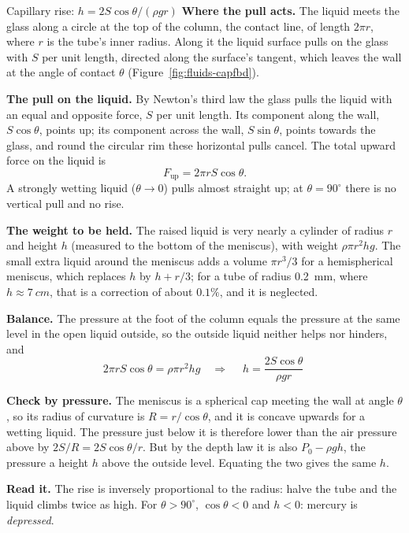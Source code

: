 \begin{figure}[htbp]
\centering
{}
\end{figure}

\begin{derivbox}{Capillary rise: $h=2S\cos\theta/(\rho gr)$}
 \textbf{Where the pull acts.} The liquid meets the glass along a circle at the top of the column, the
contact line, of length $2\pi r$, where $r$ is the tube's inner radius. Along it the liquid surface pulls on
the glass with $S$ per unit length, directed along the surface's tangent, which leaves the wall at the
angle of contact $\theta$ (Figure~\ref{fig:fluids-capfbd}).

 \textbf{The pull on the liquid.} By Newton's third law the glass pulls the liquid with an equal and
opposite force, $S$ per unit length. Its component along the wall, $S\cos\theta$, points up; its component
across the wall, $S\sin\theta$, points towards the glass, and round the circular rim these horizontal pulls
cancel. The total upward force on the liquid is
\[
F_{\text{up}}=2\pi rS\cos\theta.
\]
A strongly wetting liquid ($\theta\to0$) pulls almost straight up; at $\theta=90^\circ$ there is no vertical
pull and no rise.

 \textbf{The weight to be held.} The raised liquid is very nearly a cylinder of radius $r$ and height
$h$ (measured to the bottom of the meniscus), with weight $\rho\pi r^2hg$. The small extra liquid around
the meniscus adds a volume $\pi r^3/3$ for a hemispherical meniscus, which replaces $h$ by $h+r/3$; for a
tube of radius \SI{0.2}{mm}, where $h\approx\SI{7}{cm}$, that is a correction of about $0.1\%$, and it is
neglected.

 \textbf{Balance.} The pressure at the foot of the column equals the pressure at the same level in
the open liquid outside, so the outside liquid neither helps nor hinders, and
\[
2\pi rS\cos\theta=\rho\pi r^2hg\quad\Longrightarrow\quad\boxed{\;h=\frac{2S\cos\theta}{\rho gr}\;}
\]

 \textbf{Check by pressure.} The meniscus is a spherical cap meeting the wall at angle $\theta$, so
its radius of curvature is $R=r/\cos\theta$, and it is concave upwards for a wetting liquid. The pressure
just below it is therefore lower than the air pressure above by $2S/R=2S\cos\theta/r$. But by the depth
law it is also $P_0-\rho gh$, the pressure a height $h$ above the outside level. Equating the two gives the
same $h$.

 \textbf{Read it.} The rise is inversely proportional to the radius: halve the tube and the liquid
climbs twice as high. For $\theta>90^\circ$, $\cos\theta<0$ and $h<0$: mercury is \emph{depressed}.
\end{derivbox}

